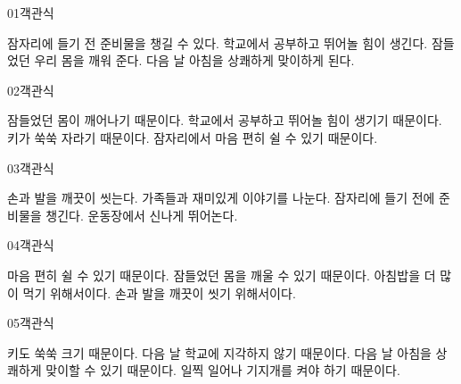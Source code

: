 \documentclass[fs13,seriesSau]{korfarm-base}
\begin{document}
\begin{kfQBlock}{01}{객관식}
\begin{kfChoices}
\kfChoice 잠자리에 들기 전 준비물을 챙길 수 있다.
\kfChoice 학교에서 공부하고 뛰어놀 힘이 생긴다.
\kfChoice 잠들었던 우리 몸을 깨워 준다.
\kfChoice 다음 날 아침을 상쾌하게 맞이하게 된다.
\end{kfChoices}
\end{kfQBlock}
\begin{kfQBlock}{02}{객관식}
\begin{kfChoices}
\kfChoice 잠들었던 몸이 깨어나기 때문이다.
\kfChoice 학교에서 공부하고 뛰어놀 힘이 생기기 때문이다.
\kfChoice 키가 쑥쑥 자라기 때문이다.
\kfChoice 잠자리에서 마음 편히 쉴 수 있기 때문이다.
\end{kfChoices}
\end{kfQBlock}
\begin{kfQBlock}{03}{객관식}
\begin{kfChoices}
\kfChoice 손과 발을 깨끗이 씻는다.
\kfChoice 가족들과 재미있게 이야기를 나눈다.
\kfChoice 잠자리에 들기 전에 준비물을 챙긴다.
\kfChoice 운동장에서 신나게 뛰어논다.
\end{kfChoices}
\end{kfQBlock}
\begin{kfQBlock}{04}{객관식}
\begin{kfChoices}
\kfChoice 마음 편히 쉴 수 있기 때문이다.
\kfChoice 잠들었던 몸을 깨울 수 있기 때문이다.
\kfChoice 아침밥을 더 많이 먹기 위해서이다.
\kfChoice 손과 발을 깨끗이 씻기 위해서이다.
\end{kfChoices}
\end{kfQBlock}
\begin{kfQBlock}{05}{객관식}
\begin{kfChoices}
\kfChoice 키도 쑥쑥 크기 때문이다.
\kfChoice 다음 날 학교에 지각하지 않기 때문이다.
\kfChoice 다음 날 아침을 상쾌하게 맞이할 수 있기 때문이다.
\kfChoice 일찍 일어나 기지개를 켜야 하기 때문이다.
\end{kfChoices}
\end{kfQBlock}


\end{document}
